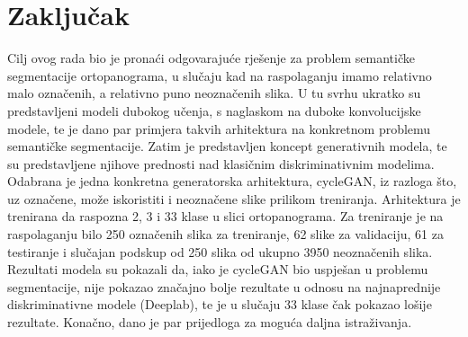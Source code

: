 \chapter{Zaključak}
Cilj ovog rada bio je pronaći odgovarajuće rješenje za problem semantičke segmentacije ortopanograma, u slučaju kad na raspolaganju imamo relativno malo označenih, a relativno puno neoznačenih slika. U tu svrhu ukratko su predstavljeni modeli dubokog učenja, s naglaskom na duboke konvolucijske modele, te je dano par primjera takvih arhitektura na konkretnom problemu semantičke segmentacije. Zatim je predstavljen koncept generativnih modela, te su predstavljene njihove prednosti nad klasičnim diskriminativnim modelima. Odabrana je jedna konkretna generatorska arhitektura, cycleGAN, iz razloga što, uz označene, može iskoristiti i neoznačene slike prilikom treniranja. Arhitektura je trenirana da raspozna 2, 3 i 33 klase u slici ortopanograma. Za treniranje je na raspolaganju bilo 250 označenih slika za treniranje, 62 slike za validaciju, 61 za testiranje i slučajan podskup od 250 slika od ukupno 3950 neoznačenih slika. Rezultati modela su pokazali da, iako je cycleGAN bio uspješan u problemu segmentacije, nije pokazao značajno bolje rezultate u odnosu na najnaprednije diskriminativne modele (Deeplab), te je u slučaju 33 klase čak pokazao lošije rezultate. Konačno, dano je par prijedloga za moguća daljna istraživanja.